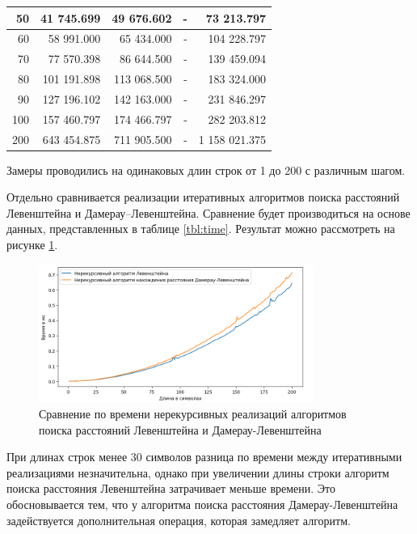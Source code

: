 \begin{table}[h]
\begin{center}
{\begin{tabular}{|r|r|r|r|r|}
			50 & 41 745.699 & 49 676.602 & - & 73 213.797 \\ \hline
			60 & 58 991.000 & 65 434.000 & - & 104 228.797 \\ \hline
			70 & 77 570.398 & 86 644.500 & - & 139 459.094 \\ \hline
			80 & 101 191.898 & 113 068.500 & - & 183 324.000 \\ \hline
			90 & 127 196.102 & 142 163.000 & - & 231 846.297 \\ \hline
			100 & 157 460.797 & 174 466.797 & - & 282 203.812 \\ \hline
			200 & 643 454.875 & 711 905.500 & - & 1 158 021.375 \\ \hline
		\end{tabular}}
	\end{center}
\end{table}

Замеры проводились на одинаковых длин строк от 1 до 200 с различным шагом.


Отдельно сравнивается реализации итеративных алгоритмов поиска расстояний Левенштейна и Дамерау--Левенштейна. Сравнение будет производиться на основе данных, представленных в таблице \ref{tbl:time}. Результат можно рассмотреть на рисунке \ref{plt:time_01}.

\begin{figure}[h]
	\centering
	\includegraphics[width=0.8\textwidth]{img/diag_01.png}
	\caption{Сравнение по времени нерекурсивных реализаций алгоритмов поиска расстояний Левенштейна и Дамерау-Левенштейна}
	\label{plt:time_01}
\end{figure}

При длинах строк менее 30 символов разница по времени между итеративными реализациями незначительна, однако при увеличении длины строки алгоритм поиска расстояния Левенштейна затрачивает меньше времени.
Это обосновывается тем, что у алгоритма поиска расстояния Дамерау-Левенштейна задействуется дополнительная операция, которая замедляет алгоритм.

